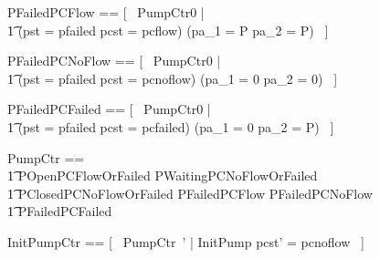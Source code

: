 \documentclass{report} %
\begin{document}
\begin{zed}
  PFailedPCFlow == [~ PumpCtr0 | \\
      \t1 (pst = pfailed \land pcst = pcflow) \implies (pa\_1 = P \land pa\_2 = P) ~]
\end{zed}

\begin{zed}
  PFailedPCNoFlow == [~ PumpCtr0 | \\
      \t1 (pst = pfailed \land pcst = pcnoflow) \implies (pa\_1 = 0 \land pa\_2 = 0) ~]
\end{zed}

\begin{zed}
  PFailedPCFailed == [~ PumpCtr0 | \\
      \t1 (pst = pfailed \land pcst = pcfailed) \implies (pa\_1 = 0 \land pa\_2 = P) ~]
\end{zed}


\begin{zed}
  PumpCtr == \\ %
  \t1 POpenPCFlowOrFailed \land PWaitingPCNoFlowOrFailed \land \\ %
  \t1 PClosedPCNoFlowOrFailed \land PFailedPCFlow \land PFailedPCNoFlow \land  \\
  \t1 PFailedPCFailed
\end{zed}

\begin{zed}
  InitPumpCtr == [~ PumpCtr~' | InitPump \land pcst' = pcnoflow ~]
\end{zed}
\end{document}
